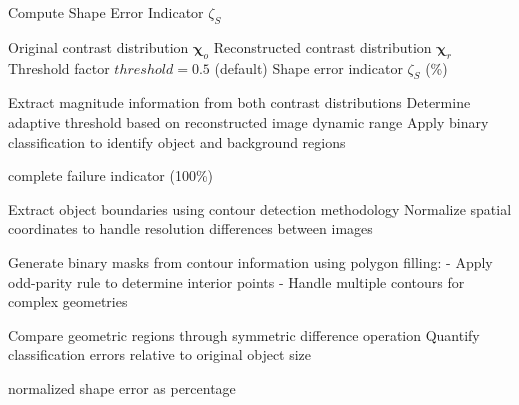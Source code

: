 \begin{algorithm}
\caption{Compute Shape Error Indicator $\zeta_S$}
\label{alg:compute_zeta_s}
\begin{algorithmic}[1]
\REQUIRE Original contrast distribution $\boldsymbol{\chi}_o$
\REQUIRE Reconstructed contrast distribution $\boldsymbol{\chi}_r$
\REQUIRE Threshold factor $threshold = 0.5$ (default)
\ENSURE Shape error indicator $\zeta_S$ (\%)

\STATE Extract magnitude information from both contrast distributions
\STATE Determine adaptive threshold based on reconstructed image dynamic range
\STATE Apply binary classification to identify object and background regions

    \RETURN complete failure indicator (100\%)
\ENDIF

\STATE Extract object boundaries using contour detection methodology
\STATE Normalize spatial coordinates to handle resolution differences between images

\STATE Generate binary masks from contour information using polygon filling:
\STATE \quad - Apply odd-parity rule to determine interior points
\STATE \quad - Handle multiple contours for complex geometries

\STATE Compare geometric regions through symmetric difference operation
\STATE Quantify classification errors relative to original object size

\RETURN normalized shape error as percentage
\end{algorithmic}
\end{algorithm}
